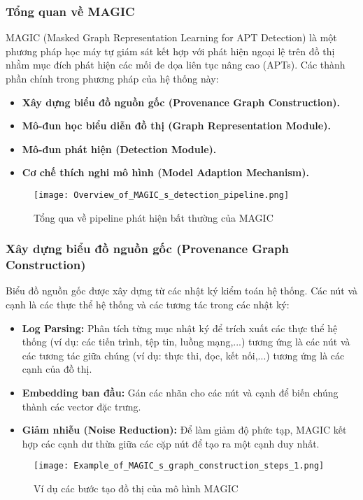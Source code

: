 \subsubsection{Tổng quan về MAGIC}
MAGIC (Masked Graph Representation Learning for APT Detection) là một phương pháp học máy tự giám sát kết hợp với phát hiện ngoại lệ trên đồ thị nhằm mục đích phát hiện các mối đe dọa liên tục nâng cao (APTs). Các thành phần chính trong phương pháp của hệ thống này:
\begin{itemize}
    \item \textbf{Xây dựng biểu đồ nguồn gốc (Provenance Graph Construction).}
    \item \textbf{Mô-đun học biểu diễn đồ thị (Graph Representation Module).}
    \item \textbf{Mô-đun phát hiện (Detection Module).}
    \item \textbf{Cơ chế thích nghi mô hình (Model Adaption Mechanism).}
\end{itemize}
\begin{figure}
    \centering
    \texttt{[image: Overview\_of\_MAGIC\_s\_detection\_pipeline.png]}
    \caption{Tổng qua về pipeline phát hiện bất thường của MAGIC}
    \label{fig:Overview_of_MAGIC_s_detection_pipeline}
\end{figure}
\subsubsection{Xây dựng biểu đồ nguồn gốc (Provenance Graph Construction)}
Biểu đồ nguồn gốc được xây dựng từ các nhật ký kiểm toán hệ thống. Các nút và cạnh là các thực thể hệ thống và các tương tác trong các nhật ký:

\begin{itemize}
    \item \textbf{Log Parsing:} Phân tích từng mục nhật ký để trích xuất các thực thể hệ thống (ví dụ: các tiến trình, tệp tin, luồng mạng,...) tương ứng là các nút và các tương tác giữa chúng (ví dụ: thực thi, đọc, kết nối,...) tương ứng là các cạnh của đồ thị.
    \item \textbf{Embedding ban đầu:} Gán các nhãn cho các nút và cạnh để biến chúng thành các vector đặc trưng.
    \item \textbf{Giảm nhiễu (Noise Reduction):} Để làm giảm độ phức tạp, MAGIC kết hợp các cạnh dư thừa giữa các cặp nút để tạo ra một cạnh duy nhất.
\end{itemize}
\begin{figure}[!h] %
    \centering
    \texttt{[image: Example\_of\_MAGIC\_s\_graph\_construction\_steps\_1.png]}
    \caption{Ví dụ các bước tạo đồ thị của mô hình MAGIC}
    \label{fig:enter-label}
\end{figure}
